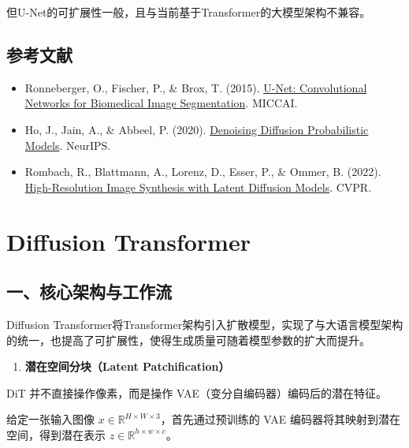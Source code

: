 但U-Net的可扩展性一般，且与当前基于Transformer的大模型架构不兼容。

\hypertarget{ux53c2ux8003ux6587ux732e-130}{%
\subsection{参考文献}\label{ux53c2ux8003ux6587ux732e-130}}

\vspace{0.25em}
\begin{itemize}
\tightlist
\item
  Ronneberger, O., Fischer, P., \& Brox, T. (2015). \href{https://arxiv.org/abs/1505.04597}{U-Net: Convolutional Networks for Biomedical Image Segmentation}. MICCAI.
\item
  Ho, J., Jain, A., \& Abbeel, P. (2020). \href{https://arxiv.org/abs/2006.11239}{Denoising Diffusion Probabilistic Models}. NeurIPS.
\item
  Rombach, R., Blattmann, A., Lorenz, D., Esser, P., \& Ommer, B. (2022). \href{https://arxiv.org/abs/2112.10752}{High-Resolution Image Synthesis with Latent Diffusion Models}. CVPR.
\end{itemize}

\clearpage

\hypertarget{diffusion-transformer}{%
\section{Diffusion Transformer}\label{diffusion-transformer}}

\hypertarget{ux4e00ux6838ux5fc3ux67b6ux6784ux4e0eux5de5ux4f5cux6d41}{%
\subsection{一、核心架构与工作流}\label{ux4e00ux6838ux5fc3ux67b6ux6784ux4e0eux5de5ux4f5cux6d41}}

Diffusion Transformer将Transformer架构引入扩散模型，实现了与大语言模型架构的统一，也提高了可扩展性，使得生成质量可随着模型参数的扩大而提升。

\begin{enumerate}
\def\labelenumi{\arabic{enumi}.}
\tightlist
\item
  \textbf{潜在空间分块（Latent Patchification）}
\end{enumerate}

DiT 并不直接操作像素，而是操作 VAE（变分自编码器）编码后的潜在特征。

给定一张输入图像 \(x\in\mathbb{R}^{H\times W\times 3}\)，首先通过预训练的 VAE 编码器将其映射到潜在空间，得到潜在表示 \(z\in\mathbb{R}^{h\times w\times c}\)。

